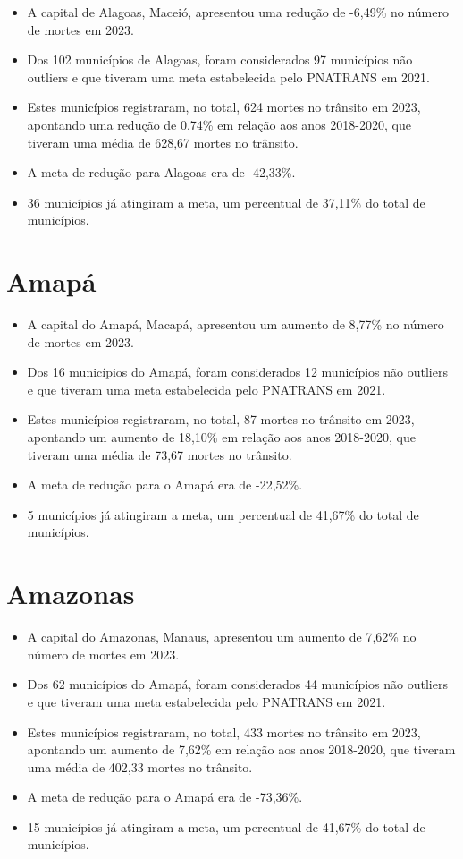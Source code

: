 \documentclass[
  letterpaper,
  DIV=11,
  numbers=noendperiod]{scrreprt}
\begin{document}
\begin{itemize}
\item
  A capital de Alagoas, Maceió, apresentou uma redução de -6,49\% no
  número de mortes em 2023.
\item
  Dos 102 municípios de Alagoas, foram considerados 97 municípios não
  outliers e que tiveram uma meta estabelecida pelo PNATRANS em 2021.
\item
  Estes municípios registraram, no total, 624 mortes no trânsito em
  2023, apontando uma redução de 0,74\% em relação aos anos 2018-2020,
  que tiveram uma média de 628,67 mortes no trânsito.
\item
  A meta de redução para Alagoas era de -42,33\%.
\item
  36 municípios já atingiram a meta, um percentual de 37,11\% do total
  de municípios.
\end{itemize}

\section{Amapá}\label{amapuxe1}

\begin{itemize}
\item
  A capital do Amapá, Macapá, apresentou um aumento de 8,77\% no número
  de mortes em 2023.
\item
  Dos 16 municípios do Amapá, foram considerados 12 municípios não
  outliers e que tiveram uma meta estabelecida pelo PNATRANS em 2021.
\item
  Estes municípios registraram, no total, 87 mortes no trânsito em 2023,
  apontando um aumento de 18,10\% em relação aos anos 2018-2020, que
  tiveram uma média de 73,67 mortes no trânsito.
\item
  A meta de redução para o Amapá era de -22,52\%.
\item
  5 municípios já atingiram a meta, um percentual de 41,67\% do total de
  municípios.
\end{itemize}

\section{Amazonas}\label{amazonas}

\begin{itemize}
\item
  A capital do Amazonas, Manaus, apresentou um aumento de 7,62\% no
  número de mortes em 2023.
\item
  Dos 62 municípios do Amapá, foram considerados 44 municípios não
  outliers e que tiveram uma meta estabelecida pelo PNATRANS em 2021.
\item
  Estes municípios registraram, no total, 433 mortes no trânsito em
  2023, apontando um aumento de 7,62\% em relação aos anos 2018-2020,
  que tiveram uma média de 402,33 mortes no trânsito.
\item
  A meta de redução para o Amapá era de -73,36\%.
\item
  15 municípios já atingiram a meta, um percentual de 41,67\% do total
  de municípios.
\end{itemize}
\end{document}
